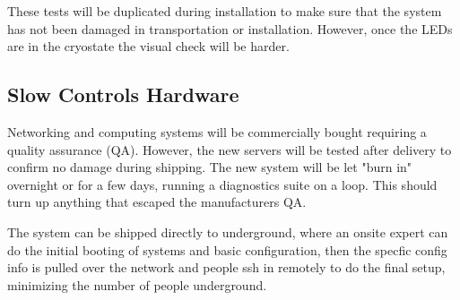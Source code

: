 These tests will be duplicated during
installation to make sure that the system has
not been damaged in transportation or installation. However, once
the LEDs are in the cryostate the visual check will be harder.


\subsection{Slow Controls Hardware}
\label{sec:fdsp-slow-cryo-qc-sc-hard}

Networking and computing systems will be commercially bought requiring a quality assurance (QA). However, the new servers will be tested after delivery to confirm no damage during shipping. The new system will be let "burn in" overnight or for a few days, running a diagnostics suite on a loop. This should turn up anything that escaped the manufacturers QA.

The system can be shipped directly to underground, where an onsite expert can do the initial booting of systems and basic configuration, then the specfic
config info is pulled over the network and people ssh in remotely to do
the final setup, minimizing the number of people underground.

 
